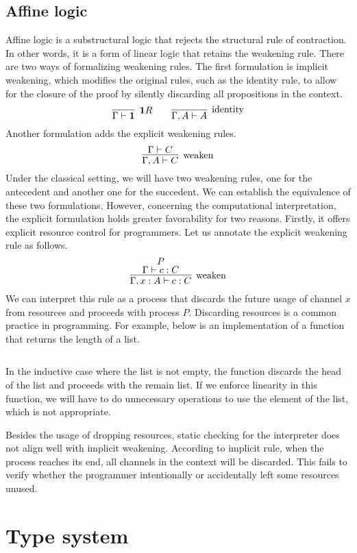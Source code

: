 \documentclass[12pt, openany]{memoir}
\begin{document}
\section{Affine logic}
Affine logic is a substructural logic that rejects the structural rule of contraction. 
In other words, it is a form of linear logic that retains the weakening rule. 
There are two ways of formalizing weakening rules. 
The first formulation is implicit weakening, which modifies the original rules, 
such as the identity rule, to allow for the closure of the proof by silently discarding all propositions in the context.
\[
  \infer[\textbf{1}R]{\Gamma \vdash \textbf{1}}{}
  \qquad
  \infer[\text{identity}]{\Gamma, A \vdash A}{}
\]
Another formulation adds the explicit weakening rules.
\[
  \infer[\text{weaken}]{\Gamma, A \vdash C}{\Gamma \vdash C}
\]
Under the classical setting, we will have two weakening rules, one for the antecedent and another one for the succedent.
We can establish the equivalence of these two formulations. 
However, concerning the computational interpretation, the explicit formulation holds greater favorability for two reasons.
Firstly, it offers explicit resource control for programmers. 
Let us annotate the explicit weakening rule as follows.
\[
  \infer[\text{weaken}]{\Gamma, x : A \vdash c : C}{
    \deduce{\Gamma \vdash c : C}{P}
  }
\]
We can interpret this rule as a process that discards the future usage of channel $x$ from resources and proceeds with process $P$. 
Discarding resources is a common practice in programming. For example, below is an implementation of a function that returns the length of a list.
\inputminted{ocaml}{code/length.ml}
In the inductive case where the list is not empty, the function discards the head of the list and proceeds with the remain list.
If we enforce linearity in this function, we will have to do unnecessary operations to use the element of the list, which is not appropriate.

Besides the usage of dropping resources, static checking for the interpreter does not align well with implicit weakening. 
According to implicit rule, when the process reaches its end, all channels in the context will be discarded. 
This fails to verify whether the programmer intentionally or accidentally left some resources unused.

\chapter{Type system}
\end{document}

